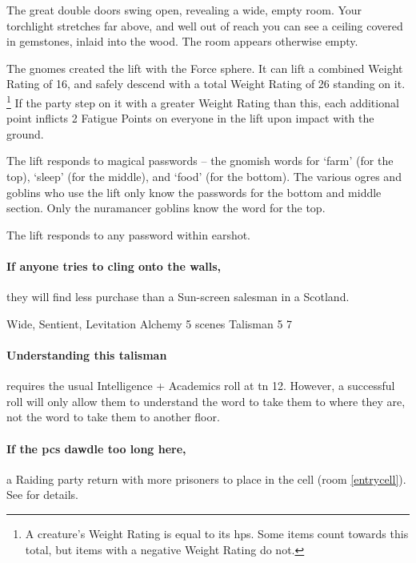 \begin{multicols}{2}

\begin{boxtext}

  The great double doors swing open, revealing a wide, empty room.
  Your torchlight stretches far above, and well out of reach you can see a ceiling covered in gemstones, inlaid into the wood.
  The room appears otherwise empty.

\end{boxtext}

The gnomes created the lift with the Force sphere.
It can lift a combined Weight Rating of 16, and safely descend with a total Weight Rating of 26 standing on it.%
\footnote{A creature's Weight Rating is equal to its \glspl{hp}.
Some items count towards this total, but items with a negative Weight Rating do not.}
If the party step on it with a greater Weight Rating than this, each additional point inflicts 2 Fatigue Points on everyone in the lift upon impact with the ground.

The lift responds to magical passwords -- the gnomish words for `farm' (for the top), `sleep' (for the middle), and `food' (for the bottom).
The various ogres and goblins who use the lift only know the passwords for the bottom and middle section.
Only the nuramancer goblins know the word for the top.

The lift responds to any password within earshot.

\paragraph{If anyone tries to cling onto the walls,}
they will find less purchase than a Sun-screen salesman in a Scotland.

%
{Wide, Sentient, Levitation}%
{Alchemy}%
{5 scenes}%
{Talisman}%
{5}%
{7}

\paragraph{Understanding this talisman}
requires the usual Intelligence + Academics roll at \gls{tn} 12.
However, a successful roll will only allow them to understand the word to take them to where they are, not the word to take them to another floor.

\paragraph{If the \glspl{pc} dawdle too long here,}
a Raiding party return with more prisoners to place in the cell (room \ref{entrycell}).
See  for details.


\end{multicols}
